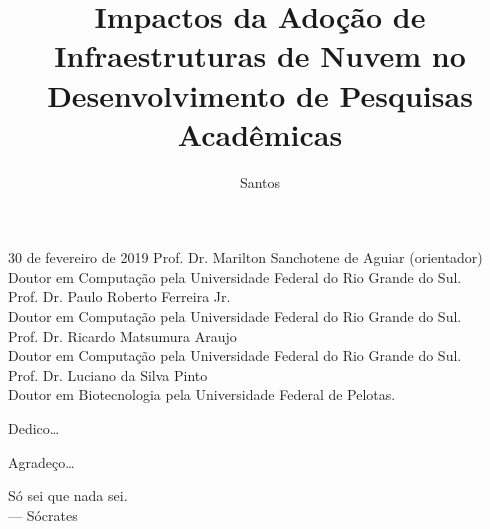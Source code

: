 \documentclass[tese,capa]{texufpel}
\title{Impactos da Adoção de Infraestruturas de Nuvem no Desenvolvimento de Pesquisas Acadêmicas}
\author{Santos}{Maicon Ança dos}
\begin{document}
\maketitle 

\sloppy

\fichacatalografica

\begin{aprovacao}{30 de fevereiro de 2019} %
\noindent Prof. Dr. Marilton Sanchotene de Aguiar (orientador)\\
Doutor em Computação pela Universidade Federal do Rio Grande do Sul.\\[1cm]

\noindent Prof. Dr. Paulo Roberto Ferreira Jr.\\
Doutor em Computação pela Universidade Federal do Rio Grande do Sul.\\[1cm]

\noindent Prof. Dr. Ricardo Matsumura Araujo\\
Doutor em Computação pela Universidade Federal do Rio Grande do Sul.\\[1cm]

\noindent Prof. Dr. Luciano da Silva Pinto\\
Doutor em Biotecnologia pela Universidade Federal de Pelotas.
\end{aprovacao}

\begin{dedicatoria}
  Dedico\ldots 
\end{dedicatoria}

\begin{agradecimentos}
  Agradeço\ldots 
\end{agradecimentos}

\begin{epigrafe}
  Só sei que nada sei.\\
  {\sc --- Sócrates}
\end{epigrafe}

\begin{abstract}
\end{abstract}
\end{document}
